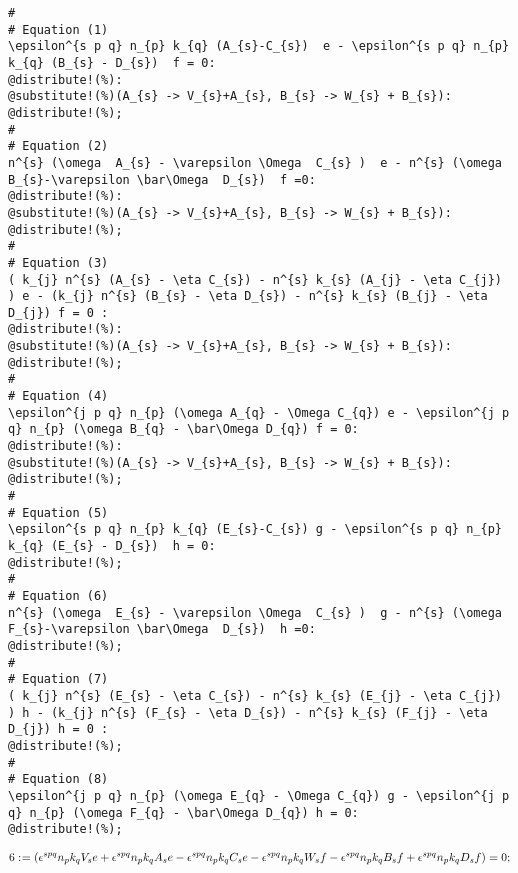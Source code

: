 \documentclass[11pt]{article}
\def\specialcolon{\mathrel{\mathop{:}}\hspace{-.5em}}
\renewcommand{\bar}[1]{\overline{#1}}
\begin{document}
{\color[named]{Blue}\begin{verbatim}
#
# Equation (1)
\epsilon^{s p q} n_{p} k_{q} (A_{s}-C_{s})  e - \epsilon^{s p q} n_{p} k_{q} (B_{s} - D_{s})  f = 0:
@distribute!(%):
@substitute!(%)(A_{s} -> V_{s}+A_{s}, B_{s} -> W_{s} + B_{s}):
@distribute!(%);
#
# Equation (2)
n^{s} (\omega  A_{s} - \varepsilon \Omega  C_{s} )  e - n^{s} (\omega   B_{s}-\varepsilon \bar\Omega  D_{s})  f =0:
@distribute!(%):
@substitute!(%)(A_{s} -> V_{s}+A_{s}, B_{s} -> W_{s} + B_{s}):
@distribute!(%);
#
# Equation (3)
( k_{j} n^{s} (A_{s} - \eta C_{s}) - n^{s} k_{s} (A_{j} - \eta C_{j}) ) e - (k_{j} n^{s} (B_{s} - \eta D_{s}) - n^{s} k_{s} (B_{j} - \eta D_{j}) f = 0 :
@distribute!(%):
@substitute!(%)(A_{s} -> V_{s}+A_{s}, B_{s} -> W_{s} + B_{s}):
@distribute!(%);
#
# Equation (4)
\epsilon^{j p q} n_{p} (\omega A_{q} - \Omega C_{q}) e - \epsilon^{j p q} n_{p} (\omega B_{q} - \bar\Omega D_{q}) f = 0:
@distribute!(%):
@substitute!(%)(A_{s} -> V_{s}+A_{s}, B_{s} -> W_{s} + B_{s}):
@distribute!(%);
#
# Equation (5)
\epsilon^{s p q} n_{p} k_{q} (E_{s}-C_{s}) g - \epsilon^{s p q} n_{p} k_{q} (E_{s} - D_{s})  h = 0:
@distribute!(%);
#
# Equation (6)
n^{s} (\omega  E_{s} - \varepsilon \Omega  C_{s} )  g - n^{s} (\omega   F_{s}-\varepsilon \bar\Omega  D_{s})  h =0:
@distribute!(%);
#
# Equation (7)
( k_{j} n^{s} (E_{s} - \eta C_{s}) - n^{s} k_{s} (E_{j} - \eta C_{j}) ) h - (k_{j} n^{s} (F_{s} - \eta D_{s}) - n^{s} k_{s} (F_{j} - \eta D_{j}) h = 0 :
@distribute!(%);
#
# Equation (8)
\epsilon^{j p q} n_{p} (\omega E_{q} - \Omega C_{q}) g - \epsilon^{j p q} n_{p} (\omega F_{q} - \bar\Omega D_{q}) h = 0:
@distribute!(%);
\end{verbatim}}

\begin{dmath*}[compact, spread=2pt]
6\specialcolon{}= ({\epsilon}^{s p q} {n}_{p} {k}_{q} {V}_{s} e + {\epsilon}^{s p q} {n}_{p} {k}_{q} {A}_{s} e - {\epsilon}^{s p q} {n}_{p} {k}_{q} {C}_{s} e - {\epsilon}^{s p q} {n}_{p} {k}_{q} {W}_{s} f - {\epsilon}^{s p q} {n}_{p} {k}_{q} {B}_{s} f + {\epsilon}^{s p q} {n}_{p} {k}_{q} {D}_{s} f) = 0;
\end{dmath*}
\end{document}
